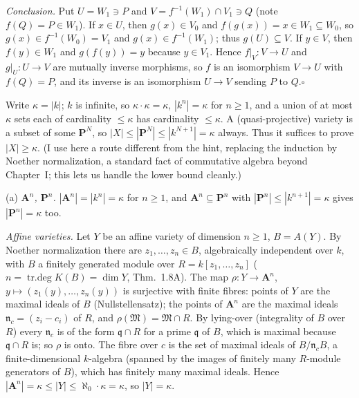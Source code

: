 \documentclass[11pt]{article}
\begin{document}
\emph{Conclusion.} Put $U=W_1\ni P$ and $V=f^{-1}(W_1)\cap V_1\ni Q$ (note $f(Q)=P\in W_1$). If $x\in U$, then $g(x)\in V_0$ and $f(g(x))=x\in W_1\subseteq W_0$, so $g(x)\in f^{-1}(W_0)=V_1$ and $g(x)\in f^{-1}(W_1)$; thus $g(U)\subseteq V$. If $y\in V$, then $f(y)\in W_1$ and $g(f(y))=y$ because $y\in V_1$. Hence $f|_V:V\to U$ and $g|_U:U\to V$ are mutually inverse morphisms, so $f$ is an isomorphism $V\to U$ with $f(Q)=P$, and its inverse is an isomorphism $U\to V$ sending $P$ to $Q$.\hfill$\square$

\pf
Write $\kappa=|k|$; $k$ is infinite, so $\kappa\cdot\kappa=\kappa$, $|k^n|=\kappa$ for $n\ge1$, and a union of at most $\kappa$ sets each of cardinality $\le\kappa$ has cardinality $\le\kappa$. A (quasi-projective) variety is a subset of some $\mathbf P^N$, so $|X|\le|\mathbf P^N|\le|k^{N+1}|=\kappa$ always. Thus it suffices to prove $|X|\ge\kappa$. (I use here a route different from the hint, replacing the induction by Noether normalization, a standard fact of commutative algebra beyond Chapter~I; this lets us handle the lower bound cleanly.)

(a) \emph{$\mathbf A^n$, $\mathbf P^n$.} $|\mathbf A^n|=|k^n|=\kappa$ for $n\ge1$, and $\mathbf A^n\subseteq\mathbf P^n$ with $|\mathbf P^n|\le|k^{n+1}|=\kappa$ gives $|\mathbf P^n|=\kappa$ too.

\emph{Affine varieties.} Let $Y$ be an affine variety of dimension $n\ge1$, $B=A(Y)$. By Noether normalization there are $z_1,\dots,z_n\in B$, algebraically independent over $k$, with $B$ a finitely generated module over $R=k[z_1,\dots,z_n]$ ($n=\operatorname{tr.deg}K(B)=\dim Y$, Thm.~1.8A). The map $\rho:Y\to\mathbf A^n$, $y\mapsto(z_1(y),\dots,z_n(y))$ is surjective with finite fibres: points of $Y$ are the maximal ideals of $B$ (Nullstellensatz); the points of $\mathbf A^n$ are the maximal ideals $\mathfrak n_c=(z_i-c_i)$ of $R$, and $\rho(\mathfrak M)=\mathfrak M\cap R$. By lying-over (integrality of $B$ over $R$) every $\mathfrak n_c$ is of the form $\mathfrak q\cap R$ for a prime $\mathfrak q$ of $B$, which is maximal because $\mathfrak q\cap R$ is; so $\rho$ is onto. The fibre over $c$ is the set of maximal ideals of $B/\mathfrak n_cB$, a finite-dimensional $k$-algebra (spanned by the images of finitely many $R$-module generators of $B$), which has finitely many maximal ideals. Hence $|\mathbf A^n|=\kappa\le|Y|\le\aleph_0\cdot\kappa=\kappa$, so $|Y|=\kappa$.
\end{document}
